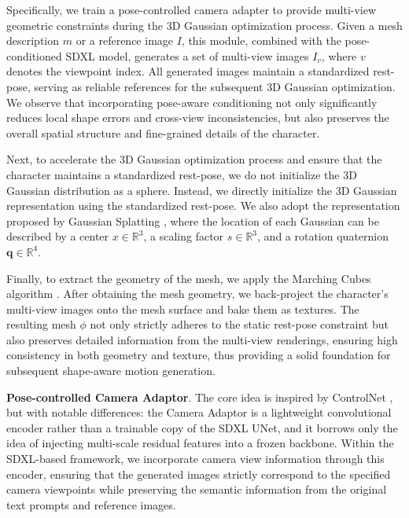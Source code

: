 \documentclass[lettersize,journal]{IEEEtran}
\newcommand{\blu}[1]{\texorpdfstring{{\leavevmode\color{blue}#1}}{#1}}
\begin{document}
Specifically, we train a pose-controlled camera adapter to provide multi-view geometric constraints during the 3D Gaussian optimization process. Given a mesh description $m$ or a reference image $I$, this module, combined with the pose-conditioned SDXL model, generates a set of multi-view images $I_v$, where $v$ denotes the viewpoint index. All generated images maintain a standardized rest-pose, serving as reliable references for the subsequent 3D Gaussian optimization. We observe that incorporating pose-aware conditioning not only significantly reduces local shape errors and cross-view inconsistencies, but also preserves the overall spatial structure and fine-grained details of the character.

Next, to accelerate the 3D Gaussian optimization process and ensure that the character maintains a standardized rest-pose, we do not initialize the 3D Gaussian distribution as a sphere. Instead, we directly initialize the 3D Gaussian representation using the standardized rest-pose. We also adopt the representation proposed by Gaussian Splatting \cite{kerbl20233d}, where the location of each Gaussian can be described by a center $x \in \mathbb{R}^3$, a scaling factor $s \in \mathbb{R}^3$, and a rotation quaternion $\mathbf{q}\in \mathbb{R}^4$.

Finally, to extract the geometry of the mesh, we apply the Marching Cubes algorithm \cite{lorensen1998marching}. After obtaining the mesh geometry, we back-project the character’s multi-view images onto the mesh surface and bake them as textures. The resulting mesh $\phi$ not only strictly adheres to the static rest-pose constraint but also preserves detailed information from the multi-view renderings, ensuring high consistency in both geometry and texture, thus providing a solid foundation for subsequent shape-aware motion generation.

\textbf{Pose-controlled Camera Adaptor}. The core idea is inspired by ControlNet
\cite{zhang2023adding}, but with notable differences: \blu{the Camera Adaptor is a
lightweight convolutional encoder rather than a trainable copy of the SDXL UNet, and it
borrows only the idea of injecting multi-scale residual features into a frozen} backbone.
Within the SDXL-based framework, we incorporate camera view information
\blu{through this} encoder, ensuring that the generated images strictly correspond to
the specified camera viewpoints while preserving the semantic information from the original
text prompts and reference images.
\end{document}
